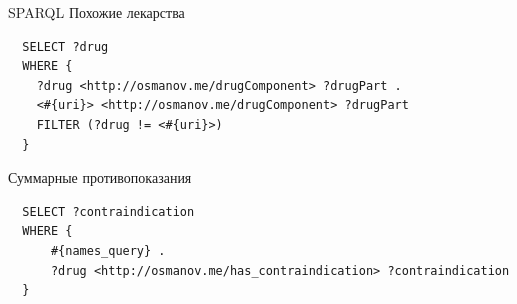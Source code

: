 \documentclass{beamer}
\begin{document}
\begin{frame}[fragile]{SPARQL}
Похожие лекарства
\begin{lstlisting}
  SELECT ?drug 
  WHERE {
    ?drug <http://osmanov.me/drugComponent> ?drugPart .
    <#{uri}> <http://osmanov.me/drugComponent> ?drugPart
    FILTER (?drug != <#{uri}>)
  }
\end{lstlisting}
Суммарные противопоказания
\begin{lstlisting}
  SELECT ?contraindication
  WHERE {
	  #{names_query} .
	  ?drug <http://osmanov.me/has_contraindication> ?contraindication
  }
\end{lstlisting}


\end{frame}
\end{document}
